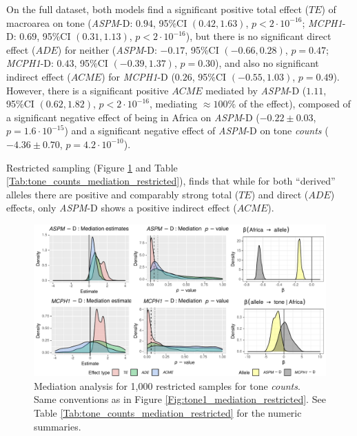 \documentclass[twoside,onecolumn]{article}
\begin{document}
On the full dataset, both models find a significant positive total effect ($TE$) of macroarea on tone (\textit{ASPM}-D: $0.94$, 95\%CI $(0.42, 1.63)$, $p < 2\cdot10^{-16}$; \textit{MCPH1}-D:  $0.69$, 95\%CI $(0.31, 1.13)$, $p < 2\cdot10^{-16}$), but there is no significant direct effect ($ADE$) for neither (\textit{ASPM}-D: $-0.17$, 95\%CI $(-0.66, 0.28)$, $p = 0.47$; \textit{MCPH1}-D:  $0.43$, 95\%CI $(-0.39, 1.37)$, $p = 0.30$), and also no significant indirect effect ($ACME$) for \textit{MCPH1}-D ($0.26$, 95\%CI $(-0.55, 1.03)$, $p = 0.49$).
However, there is a significant positive $ACME$ mediated by \textit{ASPM}-D ($1.11$, 95\%CI $(0.62, 1.82)$, $p < 2\cdot10^{-16}$, mediating $\approx 100\%$ of the effect), composed of a significant negative effect of being in Africa on \textit{ASPM}-D ($-0.22 \pm0.03$, $p = 1.6\cdot10^{-15}$) and a significant negative effect of \textit{ASPM}-D on tone \textit{counts} ($-4.36 \pm0.70$, $p = 4.2\cdot10^{-10}$).

Restricted sampling (Figure \ref{Fig:tone_counts_mediation_restricted} and Table \ref{Tab:tone_counts_mediation_restricted}), finds that while for both ``derived'' alleles there are positive and comparably strong total ($TE$) and direct ($ADE$) effects, only \textit{ASPM}-D shows a positive indirect effect ($ACME$).

\begin{figure}[h]
  \centering
  \includegraphics[width=\textwidth]{../../code/figures/tone_counts_mediation_restricted}
  \caption{Mediation analysis for 1,000 restricted samples for tone \textit{counts}. Same conventions as in Figure \ref{Fig:tone1_mediation_restricted}. See Table \ref{Tab:tone_counts_mediation_restricted} for the numeric summaries.}
  \label{Fig:tone_counts_mediation_restricted}
\end{figure}
\end{document}
